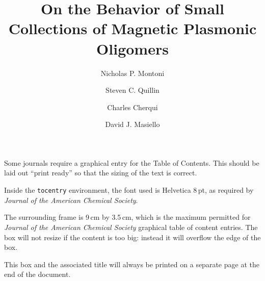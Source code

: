 \documentclass[journal=ancac3,manuscript=article]{achemso}
\author{Nicholas P. Montoni}
\author{Steven C. Quillin}
\author{Charles Cherqui}
\author{David J. Masiello}
\affiliation[University of Washington]
{Department of Chemistry, University of Washington, Seattle, WA}
\title{On the Behavior of Small Collections of Magnetic Plasmonic Oligomers}
\begin{document}
\begin{tocentry}

Some journals require a graphical entry for the Table of Contents.
This should be laid out ``print ready'' so that the sizing of the
text is correct.

Inside the \texttt{tocentry} environment, the font used is Helvetica
8\,pt, as required by \emph{Journal of the American Chemical
Society}.

The surrounding frame is 9\,cm by 3.5\,cm, which is the maximum
permitted for  \emph{Journal of the American Chemical Society}
graphical table of content entries. The box will not resize if the
content is too big: instead it will overflow the edge of the box.

This box and the associated title will always be printed on a
separate page at the end of the document.

\end{tocentry}
\end{document}
